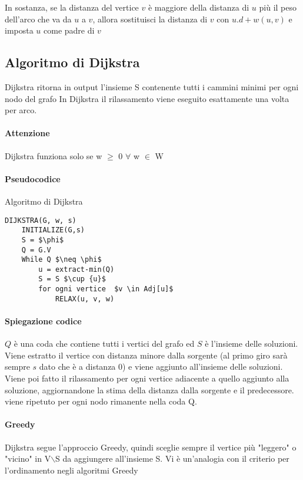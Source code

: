 \documentclass[12pt, a4paper, openany]{book}
\begin{document}
In sostanza, se la distanza del vertice $v$ è maggiore della distanza di $u$ più il peso
dell'arco che va da $u$ a $v$, allora sostituisci la distanza di $v$ con $u.d + w(u, v)$
e imposta $u$ come padre di $v$

\subsection{Algoritmo di Dijkstra}
Dijkstra ritorna in output l'insieme S contenente tutti i cammini minimi per ogni nodo del grafo
In Dijkstra il rilassamento viene eseguito esattamente una volta per arco.

\paragraph{Attenzione}
Dijkstra funziona solo se w $\geq$  0 $\forall$ w $\in$ W

\paragraph{Pseudocodice} Algoritmo di Dijkstra

\begin{lstlisting}[mathescape=true]
DIJKSTRA(G, w, s)
    INITIALIZE(G,s)
    S = $\phi$
    Q = G.V
    While Q $\neq \phi$
        u = extract-min(Q)
        S = S $\cup {u}$
        for ogni vertice  $v \in Adj[u]$ 
            RELAX(u, v, w)
\end{lstlisting}

\paragraph{Spiegazione codice}
$Q$ è una coda che contiene tutti i vertici del grafo ed $S$ è l'insieme delle soluzioni.
Viene estratto il vertice con distanza minore dalla sorgente (al primo giro sarà sempre $s$ dato che è
a distanza 0) e viene aggiunto all'insieme delle soluzioni. Viene poi fatto il rilassamento per ogni vertice adiacente
a quello aggiunto alla soluzione, aggiornandone la stima della distanza dalla sorgente e il predecessore.
viene ripetuto per ogni nodo rimanente nella coda Q.

\paragraph{Greedy}
Dijkstra segue l'approccio Greedy, quindi sceglie sempre il vertice più "leggero" o "vicino" in V$\backslash$S
da aggiungere all'insieme S. Vi è un'analogia con il criterio per l'ordinamento negli algoritmi Greedy
\end{document}
